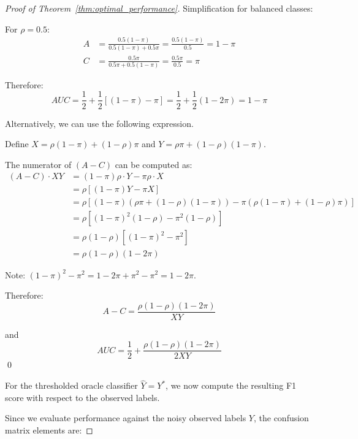 \documentclass{article}
\theoremstyle{plain}
\theoremstyle{definition}
\theoremstyle{remark}
\begin{document}
\begin{proof}[Proof of Theorem~\ref{thm:optimal_performance}]
Simplification for balanced classes:

For $\rho = 0.5$:
\begin{align}
A &= \frac{0.5(1-\pi)}{0.5(1-\pi) + 0.5\pi} = \frac{0.5(1-\pi)}{0.5} = 1-\pi \\
C &= \frac{0.5\pi}{0.5\pi + 0.5(1-\pi)} = \frac{0.5\pi}{0.5} = \pi
\end{align}

Therefore:
\begin{equation}
AUC = \frac{1}{2} + \frac{1}{2}[(1-\pi) - \pi] = \frac{1}{2} + \frac{1}{2}(1-2\pi) = 1 - \pi
\end{equation}

Alternatively, we can use the following expression.

Define $X = \rho(1-\pi) + (1-\rho)\pi$ and $Y = \rho \pi + (1-\rho)(1-\pi)$.

The numerator of $(A - C)$ can be computed as:
\begin{align}
(A - C) \cdot XY &= (1-\pi)\rho \cdot Y - \pi\rho \cdot X \\
&= \rho[(1-\pi)Y - \pi X] \\
&= \rho[(1-\pi)(\rho \pi + (1-\rho)(1-\pi)) - \pi(\rho(1-\pi) + (1-\rho)\pi)] \\
&= \rho[(1-\pi)^2(1-\rho) - \pi^2(1-\rho)] \\
&= \rho(1-\rho)[(1-\pi)^2 - \pi^2] \\
&= \rho(1-\rho)(1-2\pi)
\end{align}

Note: $(1-\pi)^2 - \pi^2 = 1 - 2\pi + \pi^2 - \pi^2 = 1 - 2\pi$.

Therefore:
\begin{equation}
A - C = \frac{\rho(1-\rho)(1-2\pi)}{XY}
\end{equation}

and
\begin{equation}
AUC = \frac{1}{2} + \frac{\rho(1-\rho)(1-2\pi)}{2XY}
\end{equation}
\qed

For the thresholded oracle classifier $\widehat{Y}=Y^{*}$, we now compute the resulting F1 score with respect to the observed labels.

Since we evaluate performance against the noisy observed labels $Y$, the confusion matrix elements are:


\end{proof}
\end{document}
